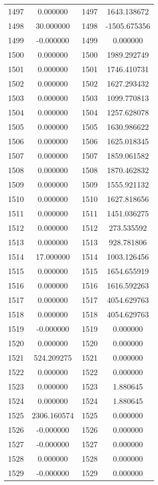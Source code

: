 \documentclass[12pt]{article}
\begin{document}
\begin{longtable}{@{}cccc@{}}
1497 & 0.000000 & 1497 & 1643.138672 \\
1498 & 30.000000 & 1498 & -1505.675356 \\
1499 & -0.000000 & 1499 & 0.000000 \\
1500 & 0.000000 & 1500 & 1989.292749 \\
1501 & 0.000000 & 1501 & 1746.410731 \\
1502 & 0.000000 & 1502 & 1627.293432 \\
1503 & 0.000000 & 1503 & 1099.770813 \\
1504 & 0.000000 & 1504 & 1257.628078 \\
1505 & 0.000000 & 1505 & 1630.986622 \\
1506 & 0.000000 & 1506 & 1625.018345 \\
1507 & 0.000000 & 1507 & 1859.061582 \\
1508 & 0.000000 & 1508 & 1870.462832 \\
1509 & 0.000000 & 1509 & 1555.921132 \\
1510 & 0.000000 & 1510 & 1627.818656 \\
1511 & 0.000000 & 1511 & 1451.036275 \\
1512 & 0.000000 & 1512 & 273.535592 \\
1513 & 0.000000 & 1513 & 928.781806 \\
1514 & 17.000000 & 1514 & 1003.126456 \\
1515 & 0.000000 & 1515 & 1654.655919 \\
1516 & 0.000000 & 1516 & 1616.592263 \\
1517 & 0.000000 & 1517 & 4054.629763 \\
1518 & 0.000000 & 1518 & 4054.629763 \\
1519 & -0.000000 & 1519 & 0.000000 \\
1520 & 0.000000 & 1520 & 0.000000 \\
1521 & 524.209275 & 1521 & 0.000000 \\
1522 & 0.000000 & 1522 & 0.000000 \\
1523 & 0.000000 & 1523 & 1.880645 \\
1524 & 0.000000 & 1524 & 1.880645 \\
1525 & 2306.160574 & 1525 & 0.000000 \\
1526 & -0.000000 & 1526 & 0.000000 \\
1527 & -0.000000 & 1527 & 0.000000 \\
1528 & 0.000000 & 1528 & 0.000000 \\
1529 & -0.000000 & 1529 & 0.000000 \\

\end{longtable}
\end{document}
